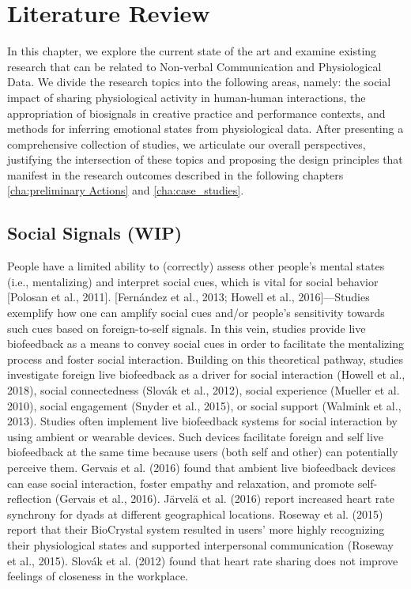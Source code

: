 \chapter{Literature Review}
\label{cha:lit_review}

In this chapter, we explore the current state of the art and examine existing research that can be related to Non-verbal Communication and Physiological Data. We divide the research topics into the following areas, namely: the social impact of sharing physiological activity in human-human interactions, the appropriation of biosignals in creative practice and performance contexts, and methods for inferring emotional states from physiological data. After presenting a comprehensive collection of studies, we articulate our overall perspectives, justifying the intersection of these topics and proposing the design principles that manifest in the research outcomes described in the following chapters \ref{cha:preliminary Actions} and \ref{cha:case_studies}.

\section{Social Signals (WIP)}
People have a limited ability to (correctly) assess other people’s mental states (i.e., mentalizing) and interpret social cues, which is vital for social behavior [Polosan et al., 2011]. [Fernández et al., 2013; Howell et al., 2016]—Studies exemplify how one can amplify social cues and/or people’s sensitivity towards such cues based on foreign-to-self signals. In this vein, studies provide live biofeedback as a means to convey social cues in order to facilitate the mentalizing process and foster social interaction. Building on this theoretical pathway, studies investigate foreign live biofeedback as a driver for social interaction (Howell et al., 2018), social connectedness (Slovák et al., 2012), social experience (Mueller et al. 2010), social engagement (Snyder et al., 2015), or social support (Walmink et al., 2013). Studies often implement live biofeedback systems for social interaction by using ambient or wearable devices. Such devices facilitate foreign and self live biofeedback at the same time because users (both self and other) can potentially perceive them. Gervais et al. (2016) found that ambient live biofeedback devices can ease social interaction, foster empathy and relaxation, and promote self-reflection (Gervais et
al., 2016). Järvelä et al. (2016) report increased heart rate synchrony for dyads at different geographical locations. Roseway et al. (2015) report that their BioCrystal system resulted in users’ more highly recognizing their physiological states and supported interpersonal communication (Roseway et al., 2015). Slovák et al. (2012) found that heart rate sharing does not improve feelings of closeness in the workplace.

